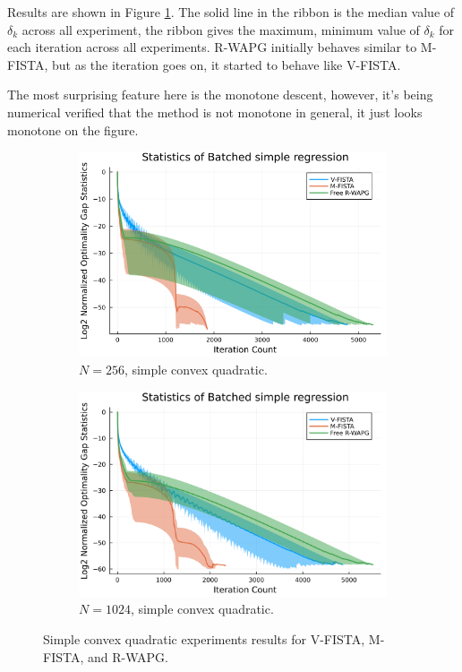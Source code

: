 \documentclass[12pt]{article}
\begin{document}
            Results are shown in Figure \ref{fig:simple-quadratic-NOG}.
            The solid line in the ribbon is the median value of $\delta_k$ across all experiment, the ribbon gives the maximum, minimum value of $\delta_k$ for each iteration across all experiments. 
            R-WAPG initially behaves similar to M-FISTA, but as the iteration goes on, it started to behave like V-FISTA.  
            \par 
            The most surprising feature here is the monotone descent, however, it's being numerical verified that the method is not monotone in general, it just looks monotone on the figure. 
            \begin{figure}[H]
                \begin{subfigure}[b]{0.47\textwidth}
                    \centering
                    \includegraphics[width=\textwidth]{assets/simple_regression_batched-256.png}
                    \caption{$N = 256$, simple convex quadratic.}
                \end{subfigure}
                \hfill
                \begin{subfigure}[b]{0.47\textwidth}
                    \centering
                    \includegraphics[width=\textwidth]{assets/simple_regression_batched-1024.png}
                    \caption{$N = 1024$, simple convex quadratic. }
                \end{subfigure}
                \caption{Simple convex quadratic experiments results for V-FISTA, M-FISTA, and R-WAPG. }
                \label{fig:simple-quadratic-NOG}
            \end{figure}
\end{document}
